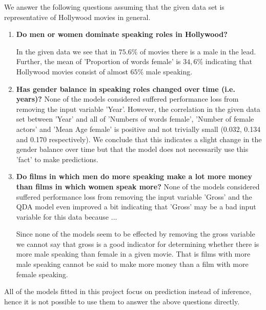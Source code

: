 \documentclass[../../project.tex]{subfiles}
\begin{document}
	We answer the following questions assuming that the given data set is representative of Hollywood movies in general.
\begin{enumerate}
    \item \textbf{Do men or women dominate speaking roles in Hollywood?}
    
       In the given data we see that in $75.6\%$ of movies there is a male in the lead. Further, the mean of 'Proportion of words female' is $34,6\%$ indicating that Hollywood movies consist of almost $65\%$ male speaking.
    
    \item \textbf{Has gender balance in speaking roles changed over time (i.e. years)?}
        None of the models considered suffered performance loss from removing the input variable 'Year'. However, the correlation in the given data set between 'Year' and all of 'Numbers of words female', 'Number of female actors' and 'Mean Age female' is positive and not trivially small (0.032, 0.134 and 0.170 respectively). We conclude that this indicates a slight change in the gender balance over time but that the model does not necessarily use this 'fact' to make predictions.
        
   
    \item \textbf{Do films in which men do more speaking make a lot more money than films in which women speak more?}
    None of the models considered suffered performance loss from removing the input variable 'Gross' and the QDA model even improved a bit indicating that 'Gross' may be a bad input variable for this data because ...
    
    Since none of the models seem to be effected by removing the gross variable we cannot say that gross is a good indicator for determining whether there is more male speaking than female in a given movie. That is films with more male speaking cannot be said to make more money than a film with more female speaking.    
\end{enumerate}
	
All of the models fitted in this project focus on prediction instead of inference, hence it is not possible to use them to answer the above questions directly.
	
	
\end{document}
